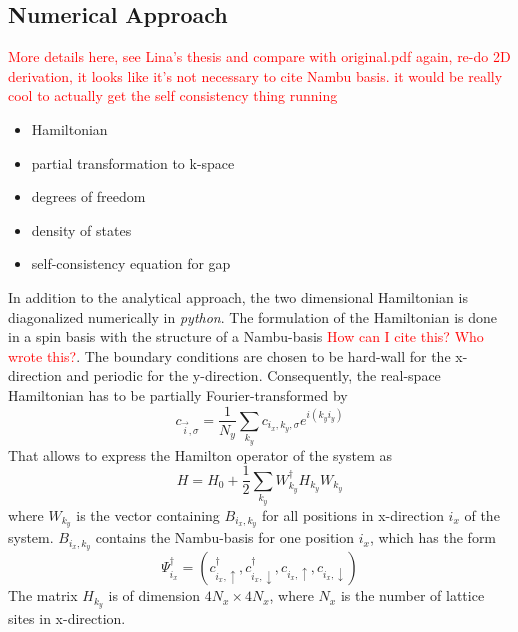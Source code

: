 \subsection{Numerical Approach} \label{sec:numerical}
\textcolor{red}{More details here, see Lina's thesis and compare with original.pdf again, re-do 2D derivation, it looks like it's not necessary to cite Nambu basis. \newline it would be really cool to actually get the self consistency thing running}
\begin{itemize}
    \item Hamiltonian
    \item partial transformation to k-space
    \item degrees of freedom
    \item density of states
    \item self-consistency equation for gap
\end{itemize}
In addition to the analytical approach, the two dimensional Hamiltonian is diagonalized numerically in \emph{python}.
The formulation of the Hamiltonian is done in a spin basis with the structure of a Nambu-basis \cite{original.pdf} \textcolor{red}{How can I cite this? Who wrote this?}.
The boundary conditions are chosen to be hard-wall for the x-direction and periodic for the y-direction.
Consequently, the real-space Hamiltonian has to be partially Fourier-transformed by
\begin{equation}\nonumber
    c_{\Vec{i},\sigma} = \frac{1}{N_y} \sum_{k_y} c_{i_x,k_y, \sigma} e^{i(k_y i_y)}
\end{equation}
That allows to express the Hamilton operator of the system as 
\begin{equation}\label{eq:ham_nambu}
    H = H_0 + \frac{1}{2} \sum_{k_y} W^{\dag}_{k_y}H_{k_y}W_{k_y}
\end{equation}
where $W_{k_y}$ is the vector containing $B_{i_x, k_y}$ for all positions in x-direction $i_x$ of the system.
$B_{i_x, k_y}$ contains the Nambu-basis for one position $i_x$, which has the form
\begin{equation}
    \Psi^{\dag}_{i_x} = \left( c^{\dag}_{i_x, \uparrow}, c^{\dag}_{i_x, \downarrow}, c_{i_x, \uparrow}, c_{i_x, \downarrow} \right)
\end{equation}
The matrix $H_{k_y}$ is of dimension $4N_x \times 4N_x$, where $N_x$ is the number of lattice sites in x-direction.\newline
